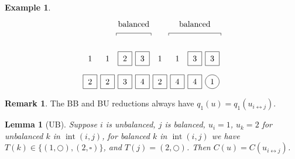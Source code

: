 \documentclass[submission]{FPSAC2018}
\newcommand{\0}{\phantom{c}}
\DeclareMathOperator{\inter}{int} %
\theoremstyle{plain}
\newtheorem{lemma}[thm]{Lemma}
\theoremstyle{definition}
\newtheorem{example}[thm]{Example}
\newtheorem{remark}[thm]{Remark}
\numberwithin{equation}{section}
\begin{document}
\begin{example}
\[\begin{tikzpicture}[baseline=25]
  \foreach \i in {3,4,7,8} { \draw (\i*\sc-.3,\ll-.3) rectangle +(0.6,+0.6); }
  \foreach \i in {1,2,5,6} { \node at (\i*\sc,\ll) {$1$}; }
  \foreach \i in {3} { \node at (\i*\sc,\ll) {$2$}; }
  \foreach \i in {4,7,8} { \node at (\i*\sc,\ll) {$3$}; }
  \foreach \i in {8} { \draw (\i*\sc,\l) circle (0.3); }
  \foreach \i in {1,2,3,4,5,6,7} { \draw (\i*\sc-.3,\l-.3) rectangle +(0.6,+0.6); }
  \foreach \i in {4,6,7} { \node at (\i*\sc,\l) {$4$}; }
  \foreach \i in {8} { \node at (\i*\sc,\l) {$1$}; }
  \foreach \i in {3} { \node at (\i*\sc,\l) {$3$}; }
  \foreach \i in {1,2,5} { \node at (\i*\sc,\l) {$2$}; }
  \draw (2.5*\sc,3) -- (2.5*\sc,3.1) -- (4.5*\sc,3.1) -- (4.5*\sc,3);
  \node at (3.5*\sc,3.5) {balanced};
  \draw (5.5*\sc,3) -- (5.5*\sc,3.1) -- (8.5*\sc,3.1) -- (8.5*\sc,3);
  \node at (7.0*\sc,3.5) {balanced};
\end{tikzpicture}
\]
\end{example}

\begin{remark}
The BB and BU reductions always have $q_1(u) = q_1(u_{i \leftrightarrow j})$.
\end{remark}

\begin{lemma}[UB]
\label{le:UB}
  Suppose $i$ is unbalanced, $j$ is balanced, $u_i = 1$, $u_k = 2$ for unbalanced $k$ in $\inter(i,j)$, for balanced $k$ in $\inter(i,j)$ we have $T(k) \in \{(1,\bigcirc),(2,\square)\}$, and $T(j) = (2,\bigcirc)$.
  Then $C(u) = C(u_{i \leftrightarrow j})$.
\end{lemma}
\end{document}
